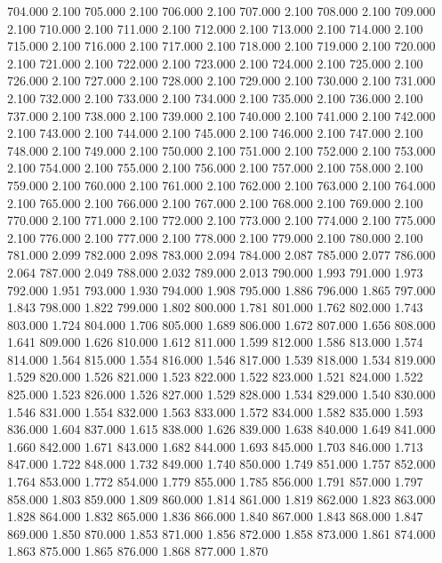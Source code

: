 704.000 2.100 
705.000 2.100 
706.000 2.100 
707.000 2.100 
708.000 2.100 
709.000 2.100 
710.000 2.100 
711.000 2.100 
712.000 2.100 
713.000 2.100 
714.000 2.100 
715.000 2.100 
716.000 2.100 
717.000 2.100 
718.000 2.100 
719.000 2.100 
720.000 2.100 
721.000 2.100 
722.000 2.100 
723.000 2.100 
724.000 2.100 
725.000 2.100 
726.000 2.100 
727.000 2.100 
728.000 2.100 
729.000 2.100 
730.000 2.100 
731.000 2.100 
732.000 2.100 
733.000 2.100 
734.000 2.100 
735.000 2.100 
736.000 2.100 
737.000 2.100 
738.000 2.100 
739.000 2.100 
740.000 2.100 
741.000 2.100 
742.000 2.100 
743.000 2.100 
744.000 2.100 
745.000 2.100 
746.000 2.100 
747.000 2.100 
748.000 2.100 
749.000 2.100 
750.000 2.100 
751.000 2.100 
752.000 2.100 
753.000 2.100 
754.000 2.100 
755.000 2.100 
756.000 2.100 
757.000 2.100 
758.000 2.100 
759.000 2.100 
760.000 2.100 
761.000 2.100 
762.000 2.100 
763.000 2.100 
764.000 2.100 
765.000 2.100 
766.000 2.100 
767.000 2.100 
768.000 2.100 
769.000 2.100 
770.000 2.100 
771.000 2.100 
772.000 2.100 
773.000 2.100 
774.000 2.100 
775.000 2.100 
776.000 2.100 
777.000 2.100 
778.000 2.100 
779.000 2.100 
780.000 2.100 
781.000 2.099 
782.000 2.098 
783.000 2.094 
784.000 2.087 
785.000 2.077 
786.000 2.064 
787.000 2.049 
788.000 2.032 
789.000 2.013 
790.000 1.993 
791.000 1.973 
792.000 1.951 
793.000 1.930 
794.000 1.908 
795.000 1.886 
796.000 1.865 
797.000 1.843 
798.000 1.822 
799.000 1.802 
800.000 1.781 
801.000 1.762 
802.000 1.743 
803.000 1.724 
804.000 1.706 
805.000 1.689 
806.000 1.672 
807.000 1.656 
808.000 1.641 
809.000 1.626 
810.000 1.612 
811.000 1.599 
812.000 1.586 
813.000 1.574 
814.000 1.564 
815.000 1.554 
816.000 1.546 
817.000 1.539 
818.000 1.534 
819.000 1.529 
820.000 1.526 
821.000 1.523 
822.000 1.522 
823.000 1.521 
824.000 1.522 
825.000 1.523 
826.000 1.526 
827.000 1.529 
828.000 1.534 
829.000 1.540 
830.000 1.546 
831.000 1.554 
832.000 1.563 
833.000 1.572 
834.000 1.582 
835.000 1.593 
836.000 1.604 
837.000 1.615 
838.000 1.626 
839.000 1.638 
840.000 1.649 
841.000 1.660 
842.000 1.671 
843.000 1.682 
844.000 1.693 
845.000 1.703 
846.000 1.713 
847.000 1.722 
848.000 1.732 
849.000 1.740 
850.000 1.749 
851.000 1.757 
852.000 1.764 
853.000 1.772 
854.000 1.779 
855.000 1.785 
856.000 1.791 
857.000 1.797 
858.000 1.803 
859.000 1.809 
860.000 1.814 
861.000 1.819 
862.000 1.823 
863.000 1.828 
864.000 1.832 
865.000 1.836 
866.000 1.840 
867.000 1.843 
868.000 1.847 
869.000 1.850 
870.000 1.853 
871.000 1.856 
872.000 1.858 
873.000 1.861 
874.000 1.863 
875.000 1.865 
876.000 1.868 
877.000 1.870 
